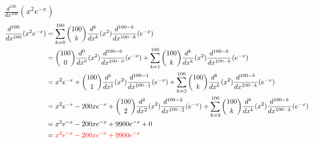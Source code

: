 \item [5.] $\displaystyle \frac{d^{100}}{dx^{100}} (x^2 e^{-x})$
\begin{align*}
    \frac{d^{100}}{dx^{100}} (x^2 e^{-x})
    &= \sum_{k=0}^{100} \binom{100}{k}
    \frac{d^{k}}{dx^{k}} (x^2)
    \frac{d^{100-k}}{dx^{100-k}} (e^{-x})\\
    &= 
    \binom{100}{0}
    \frac{d^{0}}{dx^{0}} (x^2)
    \frac{d^{100-0}}{dx^{100-0}} (e^{-x})
    +
    \sum_{k=1}^{100} \binom{100}{k}
    \frac{d^{k}}{dx^{k}} (x^2)
    \frac{d^{100-k}}{dx^{100-k}} (e^{-x})\\
    &= 
    x^2e^{-x}
    +
    \binom{100}{1}
    \frac{d^{1}}{dx^{1}} (x^2)
    \frac{d^{100-1}}{dx^{100-1}} (e^{-x})
    +
    \sum_{k=2}^{100} \binom{100}{k}
    \frac{d^{k}}{dx^{k}} (x^2)
    \frac{d^{100-k}}{dx^{100-k}} (e^{-x})\\
    &= 
    x^2e^{-x}
    -
    200xe^{-x}
    +
    \binom{100}{2}
    \frac{d^{2}}{dx^{2}} (x^2)
    \frac{d^{100-2}}{dx^{100-2}} (e^{-x})
    +
    \sum_{k=3}^{100} \binom{100}{k}
    \frac{d^{k}}{dx^{k}} (x^2)
    \frac{d^{100-k}}{dx^{100-k}} (e^{-x})\\
    &= 
    x^2e^{-x}
    -
    200xe^{-x}
    +
    9900e^{-x}
    +
    0\\
    &= \textcolor{red}{x^2e^{-x} - 200xe^{-x} + 9900e^{-x}}
\end{align*}